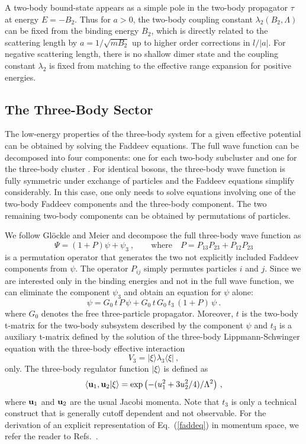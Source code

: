 \documentclass[prc,preprint,showpacs,tightenlines,%
nofootinbib]{revtex4}
\newcommand{\beq}{\begin{equation}}
\newcommand{\eeq}{\end{equation}}
\begin{document}
A two-body bound-state appears as a simple pole in the two-body propagator
$\tau$ at energy $E=-B_2$. Thus for $a>0$, the two-body coupling constant 
$\lambda_2(B_2,\Lambda)$ can be fixed from the binding energy $B_2$,
which is directly related to the scattering length by $a=1/\sqrt{mB_2}$
up to higher order corrections in $l/|a|$.
For negative scattering length, there is no shallow dimer
state and the  coupling constant $\lambda_2$ is fixed from matching to
the effective range expansion for positive energies.

%
\subsection{The Three-Body Sector}
\label{sec:effT:3body}
%
The low-energy properties of the three-body system for a given
effective potential can be obtained by solving the Faddeev equations.
The full wave function can be decomposed into four components:
one for each two-body subcluster and one for the three-body 
cluster \cite{Meier:hj}.
For identical bosons, the three-body wave function is fully symmetric under 
exchange of particles and the Faddeev equations simplify considerably.
In this case, one only needs to solve equations involving  one of the 
two-body Faddeev components and the three-body component.
The two remaining two-body components can be obtained by permutations 
of particles. 

We follow Gl\"ockle and Meier \cite{Meier:hj} and decompose
the full three-body wave function as
\beq
\Psi=(1+P)\psi+\psi_{3}~,\qquad \mbox{where}\quad
 P=P_{13}P_{23}+P_{12}P_{23}
\label{eq:defP}
\eeq
is a permutation operator that generates the two not explicitly included
Faddeev components from $\psi$. The operator $P_{ij}$ simply
permutes particles $i$ and $j$. 
Since we are interested only in the binding energies and not in the
full wave function, we can eliminate the component $\psi_3$ and obtain
an equation for $ \psi$ alone:
\beq 
\psi=G_0\, t\, P\, \psi +G_0\, t\, G_0\, t_{3}\, (1+P)\,\psi~.
\label{faddeq}
\eeq
where $G_0$ denotes the free three-particle propagator.
Moreover, $t$ is the two-body t-matrix for the two-body subsystem 
described by the component $\psi$ and
$t_3$ is a auxiliary t-matrix 
defined by the solution of the three-body Lippmann-Schwinger equation with the
three-body effective interaction
\beq
V_{3}=|\xi\rangle\lambda_3\langle\xi|~,
\label{def:3pot}
\eeq
only. 
The three-body regulator function $|\xi\rangle$ is
defined as
\beq 
\langle {\bf u}_1, {\bf u}_2 |\xi\rangle=\exp\left(
-(u_1^2+3 u_2^2/4)/\Lambda^2\right)\,,
\eeq
where ${\bf u}_1$ and ${\bf u}_2$ are the usual Jacobi momenta.
Note that $t_3$ is only a technical construct that is
generally cutoff dependent and not observable. 
For the derivation of an explicit representation of Eq.~(\ref{faddeq})
in momentum space, we refer the reader to Refs.~\cite{Platter04,Lucthesis}.
\end{document}
